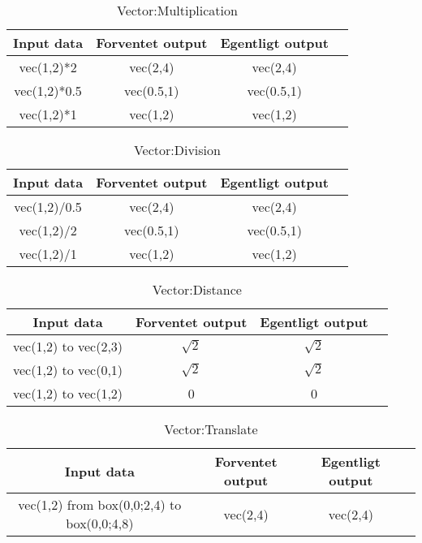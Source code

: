 \begin{table}[ht]
	\caption{Vector:Multiplication}
	\centering
	\begin{tabular}{c c c c}
		\hline\hline
		Input data & Forventet output & Egentligt output \\ [0.5ex]
		\hline
		vec(1,2)*2 & vec(2,4) & vec(2,4)\\
		vec(1,2)*0.5 & vec(0.5,1) & vec(0.5,1)\\
		vec(1,2)*1 & vec(1,2) & vec(1,2)\\
		\hline
	\end{tabular}
	\label{table:vectorMultiplication}
\end{table}

\begin{table}[ht]
	\caption{Vector:Division}
	\centering
	\begin{tabular}{c c c c}
		\hline\hline
		Input data & Forventet output & Egentligt output \\ [0.5ex]
		\hline
		vec(1,2)/0.5 & vec(2,4) & vec(2,4)\\
		vec(1,2)/2 & vec(0.5,1) & vec(0.5,1)\\
		vec(1,2)/1 & vec(1,2) & vec(1,2)\\
		\hline
	\end{tabular}
	\label{table:vectorDivision}
\end{table}

\begin{table}[ht]
	\caption{Vector:Distance}
	\centering
	\begin{tabular}{c c c c}
		\hline\hline
		Input data & Forventet output & Egentligt output \\ [0.5ex]
		\hline
		vec(1,2) to vec(2,3) & $ \sqrt{2} $ & $ \sqrt{2} $\\
		vec(1,2) to vec(0,1) & $ \sqrt{2} $ & $ \sqrt{2} $\\
		vec(1,2) to vec(1,2) & 0 & 0\\
		\hline
	\end{tabular}
	\label{table:vectorDistance}
\end{table}

\begin{table}[ht]
	\caption{Vector:Translate}
	\centering
	\begin{tabular}{c c c c}
		\hline\hline
		Input data & Forventet output & Egentligt output \\ [0.5ex]
		\hline
		vec(1,2) from box(0,0;2,4) to box(0,0;4,8) & vec(2,4) & vec(2,4)\\
		\hline
	\end{tabular}
	\label{table:vectorTranslate}
\end{table}

